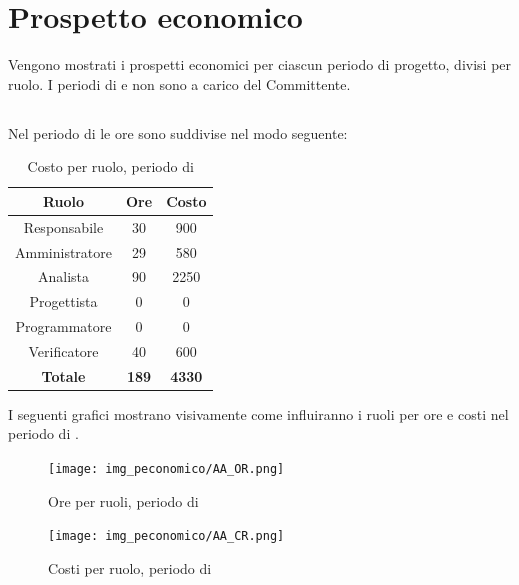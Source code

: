 \section{Prospetto economico}
Vengono mostrati i prospetti economici per ciascun periodo di progetto, divisi per ruolo. I periodi di \AR{} e \AD{} non sono a carico del Committente.

\subsection{\AR}
Nel periodo di \AR{} le ore sono suddivise nel modo seguente:
\begin{table}[H]
	\centering
	\begin{tabular}{|c|c|c|}
		\hline
		\textbf{Ruolo} &
		\textbf{Ore} &
		\textbf{Costo} \\
		\hline
		Responsabile & 30 & 900\\
		\hline
		Amministratore & 29 & 580\\
		\hline
		Analista & 90 & 2250\\
		\hline
		Progettista & 0 & 0 \\
		\hline
		Programmatore & 0 & 0 \\
		\hline
		Verificatore & 40 & 600\\
		\hline
		\textbf{Totale} & \textbf{189} & \textbf{4330} \\
		\hline
	\end{tabular}
	\caption{Costo per ruolo, periodo di \AR}
\end{table}

I seguenti grafici mostrano visivamente come influiranno i ruoli per ore e costi nel periodo di \AR.
\begin{figure}[H]
	\centering
	\texttt{[image: img\_peconomico/AA\_OR.png]}
	\caption{Ore per ruoli, periodo di \AR}
\end{figure}
\begin{figure}[H]
	\centering
	\texttt{[image: img\_peconomico/AA\_CR.png]}
	\caption{Costi per ruolo, periodo di \AR}
\end{figure}

